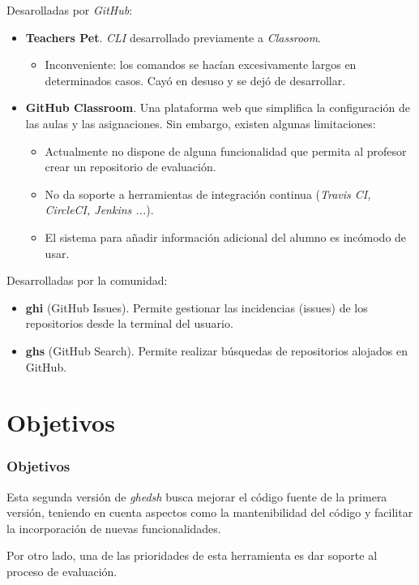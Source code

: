 \documentclass{beamer}
\begin{document}
\begin{frame}
  \framebreak
  Desarolladas por {\it GitHub}:
  \begin{itemize}
    \item \textbf{Teachers Pet}. {\it CLI} desarrollado previamente a {\it Classroom}.
    \begin{itemize}
      \item Inconveniente: los comandos se hacían excesivamente largos en determinados casos. 
      Cayó en desuso y se dejó de desarrollar.
    \end{itemize}
    \item \textbf{GitHub Classroom}. Una plataforma web que simplifica la configuración de las aulas y las asignaciones.
    Sin embargo, existen algunas limitaciones:
    \begin{itemize}
      \item Actualmente no dispone de alguna funcionalidad que permita al profesor crear un repositorio de evaluación.
      \item No da soporte a herramientas de integración continua ({\it Travis CI, CircleCI, Jenkins ...}).
      \item El sistema para añadir información adicional del alumno es incómodo de usar.
    \end{itemize}
  \end{itemize}

  \framebreak
  Desarrolladas por la comunidad:
  \begin{itemize}
    \item \textbf{ghi} (GitHub Issues). Permite gestionar las incidencias (issues) de los repositorios desde la terminal del usuario.
    \item \textbf{ghs} (GitHub Search). Permite realizar búsquedas de repositorios alojados en GitHub.
  \end{itemize}
\end{frame}

\section{Objetivos}
\begin{frame}[fragile]
  \frametitle{Objetivos}
  
  Esta segunda versión de {\it ghedsh} busca mejorar el código fuente de la primera versión,
  teniendo en cuenta aspectos como la mantenibilidad del código y facilitar la incorporación de nuevas funcionalidades.
  \bigskip

  Por otro lado, una de las prioridades de esta herramienta es dar soporte al proceso de evaluación.
\end{frame}
\end{document}
